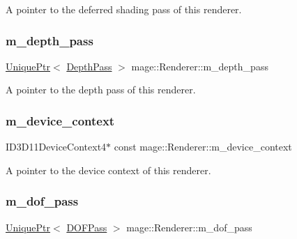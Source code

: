 A pointer to the deferred shading pass of this renderer. \hypertarget{classmage_1_1_renderer_a8c0dc117b4df9685e9e049175e5a91a6}{}\label{classmage_1_1_renderer_a8c0dc117b4df9685e9e049175e5a91a6} 
\subsubsection{\texorpdfstring{m\+\_\+depth\+\_\+pass}{m\_depth\_pass}}
{\footnotesize\ttfamily \hyperlink{namespacemage_a3316d7143a973e37adf1110f2e80ca31}{Unique\+Ptr}$<$ \hyperlink{classmage_1_1_depth_pass}{Depth\+Pass} $>$ mage\+::\+Renderer\+::m\+\_\+depth\+\_\+pass\hspace{0.3cm}{\ttfamily [private]}}

A pointer to the depth pass of this renderer. \hypertarget{classmage_1_1_renderer_ab4161386c4ddd51aa6d3299c10f1744a}{}\label{classmage_1_1_renderer_ab4161386c4ddd51aa6d3299c10f1744a} 
\subsubsection{\texorpdfstring{m\+\_\+device\+\_\+context}{m\_device\_context}}
{\footnotesize\ttfamily I\+D3\+D11\+Device\+Context4$\ast$ const mage\+::\+Renderer\+::m\+\_\+device\+\_\+context\hspace{0.3cm}{\ttfamily [private]}}

A pointer to the device context of this renderer. \hypertarget{classmage_1_1_renderer_aa0c9add6ebb5bf1ace9592c6041bf5a8}{}\label{classmage_1_1_renderer_aa0c9add6ebb5bf1ace9592c6041bf5a8} 
\subsubsection{\texorpdfstring{m\+\_\+dof\+\_\+pass}{m\_dof\_pass}}
{\footnotesize\ttfamily \hyperlink{namespacemage_a3316d7143a973e37adf1110f2e80ca31}{Unique\+Ptr}$<$ \hyperlink{classmage_1_1_d_o_f_pass}{D\+O\+F\+Pass} $>$ mage\+::\+Renderer\+::m\+\_\+dof\+\_\+pass\hspace{0.3cm}{\ttfamily [private]}}

